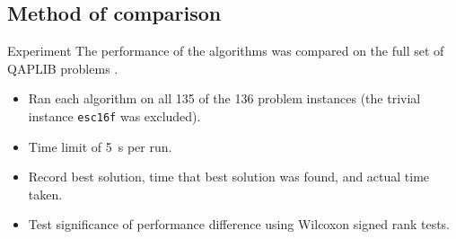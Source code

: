 {    \subsection{Method of comparison} {
        \begin{frame}{Experiment}
            The performance of the algorithms was compared on the full set of QAPLIB problems \citep{Burkard:1997ve}.

            \begin{itemize}
                \item Ran each algorithm on all 135 of the 136 problem instances (the trivial instance \texttt{esc16f} was excluded).
                \item Time limit of \SI{5}{\second} per run.
                \item Record best solution, time that best solution was found, and actual time taken.
                \item Test significance of performance difference using Wilcoxon signed rank tests.
            \end{itemize}
        \end{frame}
    }
}

